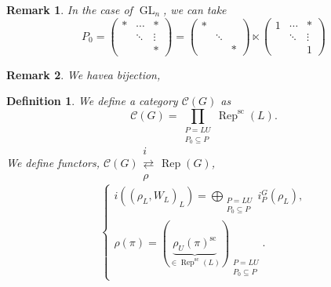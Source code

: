 \documentclass[8pt]{article}
\newtheorem{definition}{Definition}[section]
\newtheorem{remark}{Remark}[section]
\DeclareMathOperator{\GL}{GL}
\DeclareMathOperator{\Rep}{Rep}
\DeclareMathOperator{\supcus}{sc}
\newcommand{\cat}{\mathscr{C}}
\begin{document}
\begin{remark}
  In the case of $\GL_n$, we can take 
  \begin{equation*}
    P_0 = \begin{pmatrix}
      \ast & \cdots & \ast \\
      \: & \ddots & \vdots\\
      \: & \: & \ast
    \end{pmatrix}
    = \begin{pmatrix}
      \ast & \: & \: \\
      \: & \ddots & \:\\
      \: & \: & \ast
    \end{pmatrix}
    \ltimes\begin{pmatrix}
      1 & \cdots & \ast \\
      \: & \ddots& \vdots\\
      \: & \: & 1
    \end{pmatrix}
  \end{equation*}
\end{remark}

\begin{remark}
  We havea bijection,
  \begin{center}
  \end{center}
\end{remark}

\begin{definition}
  We define a category $\cat(G)$ as 
  \begin{equation*}
    \cat(G) = \prod_{\substack{P=LU\\ P_0\subseteq P}}\Rep^{\supcus}(L).
  \end{equation*}
  We define functors, $\cat(G)\substack{i\\\rightleftarrows\\\rho}\Rep(G)$,
  \begin{equation*}
    \begin{cases}
      i((\rho_L,W_L)_L) = \bigoplus_{\substack{P=LU\\ P_0\subseteq P}}i_P^G(\rho_L),\\
      \rho(\pi) = (\underbrace{\rho_U(\pi)^{\supcus}}_{\in\Rep^{\supcus}(L)})_{\substack{P=LU\\ P_0\subseteq P}}.
    \end{cases}
  \end{equation*}
\end{definition}
\end{document}
